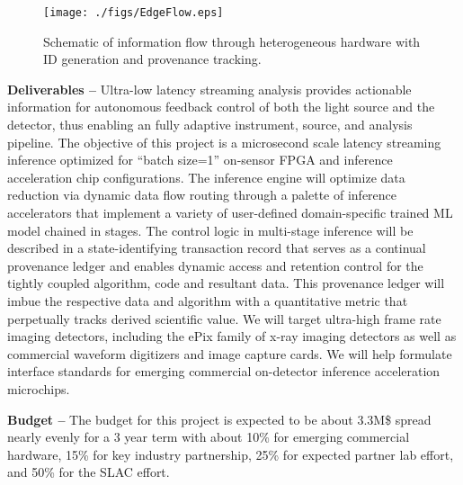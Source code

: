 \documentclass{article}
\begin{document}
\begin{figure}
	\vspace{-1\baselineskip}
	\centerline{\texttt{[image: ./figs/EdgeFlow.eps]}}
	\vspace{-1\baselineskip}
	\caption{
		\label{fig::EdgeFlow}
		Schematic of information flow through heterogeneous hardware with ID generation and provenance tracking.
		}
	\vspace{-1\baselineskip}
\end{figure}

\textbf{Deliverables -- }Ultra-low latency streaming analysis provides actionable information for autonomous feedback control of both the light source and the detector, thus enabling an fully adaptive instrument, source, and analysis pipeline.
The objective of this project is a microsecond scale latency streaming inference optimized for ``batch size=1'' on-sensor FPGA and inference acceleration chip configurations.
The inference engine will optimize data reduction via dynamic data flow routing through a palette of inference accelerators that implement a variety of user-defined domain-specific trained ML model chained in stages. 
The control logic in multi-stage inference will be described in a state-identifying transaction record that serves as a continual provenance ledger and enables dynamic access and retention control for the tightly coupled algorithm, code and resultant data.
This provenance ledger will imbue the respective data and algorithm with a quantitative metric that perpetually tracks derived scientific value.
We will target ultra-high frame rate imaging detectors, including the ePix family of x-ray imaging detectors as well as commercial waveform digitizers and image capture cards.
We will help formulate interface standards for emerging commercial on-detector inference acceleration microchips.

\textbf{Budget --} The budget for this project is expected to be about 3.3M\$ spread nearly evenly for a 3 year term with about 10\% for emerging commercial hardware, 15\% for key industry partnership, 25\% for expected partner lab effort, and 50\% for the SLAC effort.



% 
% 
% 
\end{document}
